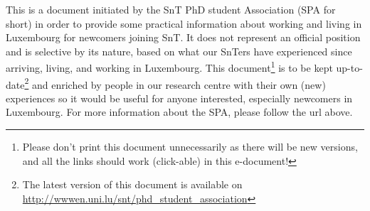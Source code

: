 This is a document initiated by the SnT PhD student Association (SPA for short) in order to provide some practical information about working and living in Luxembourg for newcomers joining SnT. It does not represent an official position and is selective by its nature, based on what our SnTers have experienced since arriving, living, and working in Luxembourg. This document\footnote{Please don't print this document unnecessarily as there will be new versions, and all the links should work (click-able) in this e-document!} is to be kept up-to-date\footnote{The latest version of this document is available on \url{http://wwwen.uni.lu/snt/phd_student_association}} and enriched by people in our research centre with their own (new) experiences so it would be useful for anyone interested, especially newcomers in Luxembourg. 
For more information about the SPA, please follow the url above. 